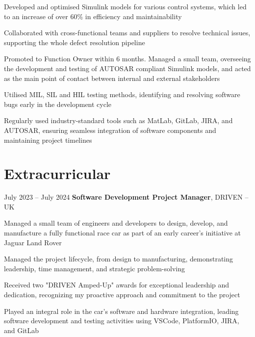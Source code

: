 	\vspace{0.10 cm}
	\begin{onecolentry}
		\begin{highlights}
			\item Developed and optimised Simulink models for various control systems, which led to an increase of over 60\% in efficiency and maintainability
			\item Collaborated with cross-functional teams and suppliers to resolve technical issues, supporting the whole defect resolution pipeline
			\item Promoted to Function Owner within 6 months. Managed a small team, overseeing the development and testing of AUTOSAR compliant Simulink models, and acted as the main point of contact between internal and external stakeholders
			\item Utilised MIL, SIL and HIL testing methods, identifying and resolving software bugs early in the development cycle
			\item Regularly used industry-standard tools such as MatLab, GitLab, JIRA, and AUTOSAR, ensuring seamless integration of software components and maintaining project timelines
		\end{highlights}
	\end{onecolentry}
	
	\section{Extracurricular}
	
	
	\begin{twocolentry}{
			July 2023 – July 2024
		}
		\textbf{Software Development Project Manager}, DRIVEN -- UK
	\end{twocolentry}
	
	\vspace{0.10 cm}
	\begin{onecolentry}
		\begin{highlights}
			\item Managed a small team of engineers and developers to design, develop, and manufacture a fully functional race car as part of an early career’s initiative at Jaguar Land Rover
			\item Managed the project lifecycle, from design to manufacturing, demonstrating leadership, time management, and strategic problem-solving
			\item Received two "DRIVEN Amped-Up" awards for exceptional leadership and dedication, recognizing my proactive approach and commitment to the project
			\item Played an integral role in the car's software and hardware integration, leading software development and testing activities using VSCode, PlatformIO, JIRA, and GitLab
		\end{highlights}
	\end{onecolentry}
	
